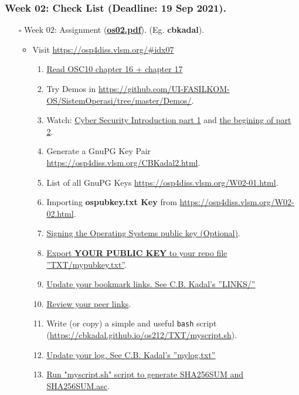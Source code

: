 \begin{frame}
\frametitle{Week 02: Check List (Deadline: 19 Sep 2021).}
\begin{itemize}
\item [$\square$] Week 02: Assignment (\href{https://os.vlsm.org/Slides/os02.pdf}{\textbf{os02.pdf}}).
(Eg. \textbf{cbkadal}).
\begin{itemize}
\item Visit \url{https://osp4diss.vlsm.org/\#idx07}
\begin{enumerate}
\item \href{https://www.os-book.com/OS10/slide-dir/}{Read OSC10 chapter 16 + chapter 17}
\item Try Demos in {\tiny \url{https://github.com/UI-FASILKOM-OS/SistemOperasi/tree/master/Demos/}}.
\item Watch: \href{https://youtu.be/rcDO8km6R6c}{Cyber Security Introduction part 1} and 
\href{https://youtu.be/CivG_2UqKMg}{the begining of part 2}.
\item Generate a GnuPG Key Pair {\tiny \url{https://osp4diss.vlsm.org/CBKadal2.html}}.
\item List of all GnuPG Keys {\tiny \url{https://osp4diss.vlsm.org/W02-01.html}}.
\item Importing \textbf{ospubkey.txt Key} from 
      {\tiny \url{https://osp4diss.vlsm.org/W02-02.html}}.
\item \href{https://osp4diss.vlsm.org/W02-03.html}{Signing the Operating Systems public key (Optional)}.
\item \href{https://osp4diss.vlsm.org/W02-04.html}{Export \textbf{YOUR PUBLIC KEY} to your repo file ''TXT/mypubkey.txt''}. 
\item \href{https://cbkadal.github.io/os212/LINKS/}{Update your bookmark links. See C.B. Kadal's ''LINKS/''}
\item \href{https://osp4diss.vlsm.org/W02-05.html}{Review your peer links}.
\item Write (or copy) a simple and useful \texttt{bash} script (\url{https://cbkadal.github.io/os212/TXT/myscript.sh}).
\item \href{https://cbkadal.github.io/os212/TXT/mylog.txt}{Update your log. See C.B. Kadal's ''mylog.txt''}
\item \href{https://osp4diss.vlsm.org/W02-06.html}{Run "myscript.sh" script to generate SHA256SUM and SHA256SUM.asc}.
\end{enumerate}
\end{itemize}
\end{itemize}
\end{frame}

